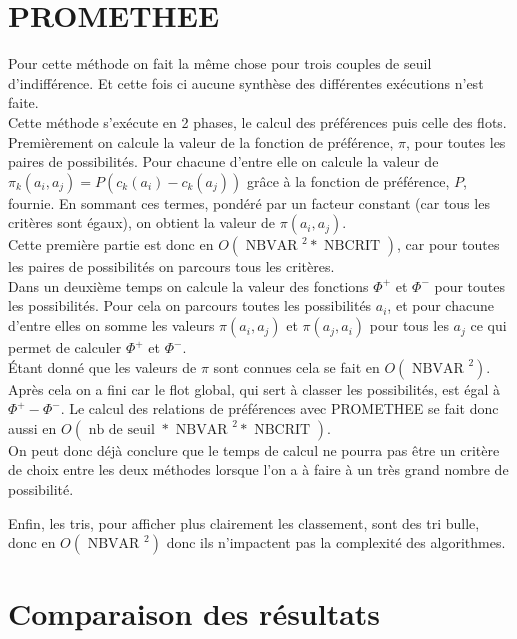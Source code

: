 \documentclass[12pt,a4paper]{article}
\begin{document}
\section{PROMETHEE}

Pour cette méthode on fait la même chose pour trois couples de seuil d’indifférence. Et cette fois ci aucune synthèse des différentes exécutions n'est faite.\\

Cette méthode s’exécute en 2 phases, le calcul des préférences puis celle des flots.\\
Premièrement on calcule la valeur de la fonction de préférence, $\pi$, pour toutes les paires de possibilités. Pour chacune d'entre elle on calcule la valeur de $ \pi_k(a_i, a_j)  = P( c_k(a_i) - c_k(a_j) )$ grâce à la fonction de préférence, $P$, fournie. En sommant ces termes, pondéré par un facteur constant (car tous les critères sont égaux), on obtient la valeur de $\pi(a_i, a_j)$.\\
Cette première partie est donc en $O( \text{ NBVAR }^2 * \text{ NBCRIT } )$, car pour toutes les paires de possibilités on parcours tous les critères.\\
Dans un deuxième temps on calcule la valeur des fonctions $\Phi^+$ et $\Phi^-$ pour toutes les possibilités. Pour cela on parcours toutes les possibilités $a_i$, et pour chacune d'entre elles on somme les valeurs $\pi(a_i, a_j)$ et $\pi(a_j,a_i)$ pour tous les $a_j$ ce qui permet de calculer $\Phi^+$ et $\Phi^-$.\\
Étant donné que les valeurs de $\pi$ sont connues cela se fait en $O( \text{ NBVAR }^2)$.\\
Après cela on a fini car le flot global, qui sert à classer les possibilités, est égal à $\Phi^+ - \Phi^-$. Le calcul des relations de préférences avec PROMETHEE se fait donc aussi en $O(\text{ nb de seuil } * \text{ NBVAR }^2 * \text{ NBCRIT } )$.\\

On peut donc déjà conclure que le temps de calcul ne pourra pas être un critère de choix entre les deux méthodes lorsque l'on a à faire à un très grand nombre de possibilité.

Enfin, les tris, pour afficher plus clairement les classement, sont des tri bulle, donc en $O( \text{ NBVAR }^2)$ donc ils n'impactent pas la complexité des algorithmes.  

\newpage
\section{Comparaison des résultats}
\end{document}
